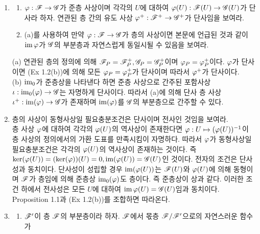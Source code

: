 \begin{enumerate}[label=\tb{1.\arabic*.},itemindent=0mm,itemsep=4mm]
	(b) $\mc O_\C$가 $\C$의 열린 부분집합 $U$에 $U$에서의 홀로모픽 함수들의 덧셈군을 대응시키는 홀로모픽 함수층이며
	$\mc O_\C^*$가 $\C$의 열린 부분집합 $U$에 $U$에서의 영점 없는 홀로모픽 함수들의 곱셈군을 대응시키는
	0이 아닌 홀로모픽 함수층이라 하자.
	$\ph:\mc O_\C\ra\mc O_\C^*,f\mt e^{2\pi if}$라 하자.
	충분히 작은 근방에서 모든 영점 없는 홀로모픽 함수는 로가리듬을 가지므로 임의의 $P$에 대하여 $\ph_P$는 전사이다.
	그러나 $U=\C^*$인 경우 $z$는 영점 없는 홀로모픽 함수이지만 대역적 로가리듬을 갖지 않으며 따라서 $\ph(U)$는 전사가 아니다.
	\item \begin{enumerate}[label=(\alph*)]
	\item $\varphi:\mathscr{F}\rightarrow\mathscr{G}$가 준층 사상이며 각각의 $U$에 대하여 $\varphi(U):\mathscr{F}(U)\rightarrow\mathscr{G}(U)$가 단사라 하자.
	연관된 층 간의 유도 사상 $\varphi^+:\mathscr{F}^+\rightarrow\mathscr{G}^+$가 단사임을 보여라.
	\item (a)를 사용하여 만약 $\varphi:\mathscr{F}\rightarrow\mathscr{G}$가 층의 사상이면 본문에 언급된 것과 같이
	$\operatorname{im}\varphi$가 $\mathscr{G}$의 부분층과 자연스럽게 동일시될 수 있음을 보여라.
	\end{enumerate}
	\sol (a) 연관된 층의 정의에 의해 $\mathscr{F}_P=\mathscr{F}^+_P,\mathscr{G}_P=\mathscr{G}^+_P$이며 $\varphi_P=\varphi^+_P$이다.
	$\varphi$가 단사이면 (Ex 1.2(b))에 의해 모든 $\varphi_P=\varphi_P^+$가 단사이며 따라서 $\varphi^+$가 단사이다.\\
	(b) $\operatorname{im}_0$가 준층상을 나타낸다 하면 준층 사상으로 간주된 포함사상 $\iota:\operatorname{im}_0(\varphi)\rightarrow\mathscr{G}$는 자명하게 단사이다.
	따라서 (a)에 의해 단사 층 사상 $\iota^+:\operatorname{im}(\varphi)\rightarrow\mathscr{G}$가 존재하며 $\operatorname{im}(\varphi)$를 $\mathscr{G}$의 부분층으로 간주할 수 있다.
	\item 층의 사상이 동형사상일 필요충분조건은 단사이며 전사인 것임을 보여라.\\
	\sol {} 층 사상 $\varphi$에 대하여 각각의 $\ph(U)$의 역사상이 존재한다면 $\varphi:U\mapsto(\varphi(U))^{-1}$이
	층 사상의 정의에서의 가환 도표를 만족시킴이 자명하다.
	따라서 $\varphi$가 동형사상일 필요충분조건은 각각의 $\ph(U)$의 역사상이 존재하는 것이다.
	즉 $\ker(\varphi(U))=(\ker(\varphi))(U)=0,\operatorname{im}(\varphi(U))=\mathscr{G}(U)$인 것이다.
	전자의 조건은 단사성과 동치이다. 단사성이 성립할 경우 $\operatorname{im}(\varphi(U))$는 $\mathscr{F}(U)$와 $\ph(U)$에 의해 동형이며
	$\mathscr{F}$가 층임에 의해 준층상 $\operatorname{im}_0(\varphi)$도 층이다. 즉 준층상이 상과 같다.
	이러한 조건 하에서 전사성은 모든 $U$에 대하여 $\operatorname{im}\varphi(U)=\mathscr{G}(U)$임과 동치이다.\\
	 Proposition 1.1과 (Ex 1.2(b))를 조합하면 따라온다.
	\item \begin{enumerate}[label=(\alph*)]
	\item $\mathscr{F}'$이 층 $\mathscr{F}$의 부분층이라 하자. $\mathscr{F}$에서 몫층 $\mathscr{F}/\mathscr{F}'$으로의 자연스러운 함수가

\end{enumerate}
\end{enumerate}

